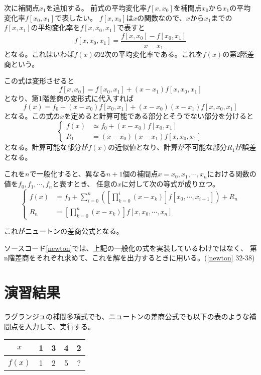 \documentclass[a4paper,11pt,dvipdfmx]{jsarticle}
\begin{document}
次に補間点$x_1$を追加する。
前式の平均変化率$f[x,x_0]$を補間点$x_0$から$x_1$の平均変化率$f[x_0,x_1]$で表したい。
$f[x,x_0]$は$x$の関数なので、$x$から$x_1$までの$f[x,x_1]$の平均変化率を$f[x,x_0,x_1]$で表すと
\[f[x,x_0,x_1]=\frac{f[x,x_0]-f[x_0,x_1]}{x-x_1}\]
となる。これはいわば$f(x)$の2次の平均変化率である。これを$f(x)$の第2階差商という。

この式は変形させると
\[f[x,x_0]=f[x_0,x_1] + (x-x_1)f[x,x_0,x_1]\]
となり、第1階差商の変形式に代入すれば
\[f(x) = f_0 +(x-x_0)f[x_0,x_1] + (x-x_0)(x-x_1)f[x,x_0,x_1]\]
となる。この式の$x$を定めると計算可能である部分とそうでない部分を分けると
\begin{equation*}
    \begin{cases}
        f(x) &\simeq f_0 +(x-x_0)f[x_0,x_1]\\
        R_1  &= (x-x_0)(x-x_1)f[x,x_0,x_1]
    \end{cases}
\end{equation*}
となる。計算可能な部分が$f(x)$の近似値となり、計算が不可能な部分$R_1$が誤差となる。

これを$n$で一般化すると、異なる$n+1$個の補間点$x=x_0,x_1,\cdots,x_n$における関数の値を$f_0,f_1,\cdots,f_n$と表すとき、
任意の$x$に対して次の等式が成り立つ。
\begin{equation*}
    \begin{cases}
        f(x) &= f_0 + \sum_{i=0}^{n}([\prod_{k=0}^{i}(x-x_k)]f[x_0,\cdots,x_{i+1}]) + R_n\\
        R_n  &= [\prod_{k=0}^{n}(x-x_k)]f[x,x_0,\cdots,x_n]
    \end{cases}
\end{equation*}

これがニュートンの差商公式となる。

ソースコード\ref{newton}では、上記の一般化の式を実装しているわけではなく、
第n階差商をそれぞれ求めて、これを解を出力するときに用いる。(\ref{newton} 32-38)

\section{演習結果}
ラグランジュの補間多項式でも、ニュートンの差商公式でも以下の表のような補間点を入力して、実行する。
\begin{center}
    \begin{tabular}[h]{|c|c|c|c|c|} \hline
         $x$   & 1 & 3 & 4 & 2 \\ \hline
        $f(x)$ & 1 & 2 & 5 & ? \\ \hline
    \end{tabular}
\end{center}
\end{document}
